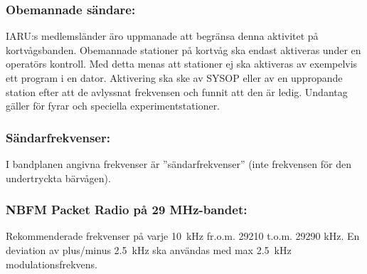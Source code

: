 \subsubsection{Obemannade sändare:}

IARU:s medlemsländer äro uppmanade att begränsa
denna aktivitet på kortvågsbanden.
Obemannade stationer på kortvåg ska endast aktiveras under en operatörs kontroll.
Med detta menas att stationer ej ska aktiveras av
exempelvis ett program i en dator. Aktivering ska ske
av SYSOP eller av en uppropande station efter att de
avlyssnat frekvensen och funnit att den är ledig.
Undantag gäller för fyrar och speciella experimentstationer.

\subsubsection{Sändarfrekvenser:}

I bandplanen angivna frekvenser är ''sändarfrekvenser''
(inte frekvensen för den undertryckta bärvågen).

\subsubsection{NBFM Packet Radio på 29 MHz-bandet:}

Rekommenderade frekvenser på varje 10~kHz fr.o.m.
29210 t.o.m. 29290 kHz.
En deviation av plus/minus 2.5~kHz ska användas med
max 2.5~kHz modulationsfrekvens.
